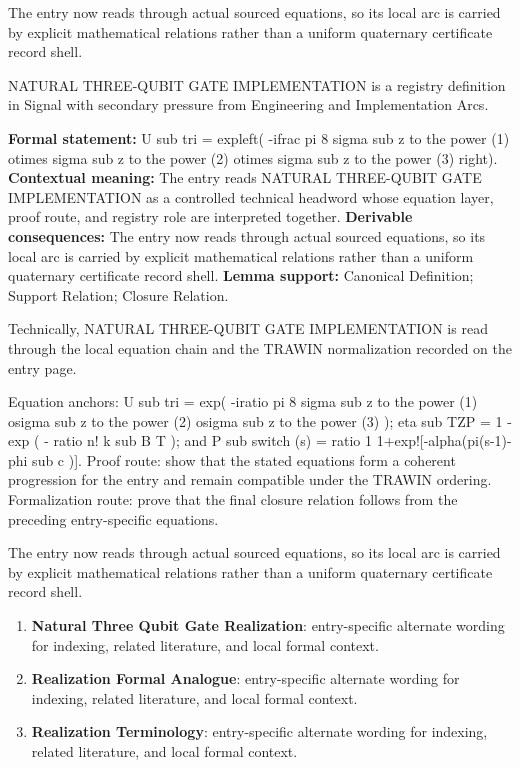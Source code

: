 The entry now reads through actual sourced equations, so its local arc is carried by explicit mathematical relations rather than a uniform quaternary certificate record shell.
\clearpage


\begingroup\small
{}
NATURAL THREE-QUBIT GATE IMPLEMENTATION is a registry definition in Signal with secondary pressure from Engineering and Implementation Arcs.

\begingroup\footnotesize\setlength{\emergencystretch}{3em}\sloppy
\textbf{Formal statement:} U sub tri = expleft( -ifrac pi 8 sigma sub z to the power (1) otimes sigma sub z to the power (2) otimes sigma sub z to the power (3) right). \textbf{Contextual meaning:} The entry reads NATURAL THREE-QUBIT GATE IMPLEMENTATION as a controlled technical headword whose equation layer, proof route, and registry role are interpreted together. \textbf{Derivable consequences:} The entry now reads through actual sourced equations, so its local arc is carried by explicit mathematical relations rather than a uniform quaternary certificate record shell. \textbf{Lemma support:} Canonical Definition; Support Relation; Closure Relation.\par
\endgroup

Technically, NATURAL THREE-QUBIT GATE IMPLEMENTATION is read through the local equation chain and the TRAWIN normalization recorded on the entry page.

Equation anchors: U sub tri = exp( -iratio pi 8 sigma sub z to the power (1) osigma sub z to the power (2) osigma sub z to the power (3) ); eta sub TZP = 1 - exp ( - ratio n! k sub B T ); and P sub switch (s) = ratio 1 1+exp![-alpha(pi(s-1)-phi sub c )]. Proof route: show that the stated equations form a coherent progression for the entry and remain compatible under the TRAWIN ordering. Formalization route: prove that the final closure relation follows from the preceding entry-specific equations.

The entry now reads through actual sourced equations, so its local arc is carried by explicit mathematical relations rather than a uniform quaternary certificate record shell.
\endgroup

\begin{enumerate}[leftmargin=1.6em,itemsep=6pt,topsep=4pt]
\item \textbf{Natural Three Qubit Gate Realization}: entry-specific alternate wording for indexing, related literature, and local formal context.
\item \textbf{Realization Formal Analogue}: entry-specific alternate wording for indexing, related literature, and local formal context.
\item \textbf{Realization Terminology}: entry-specific alternate wording for indexing, related literature, and local formal context.
\end{enumerate}

